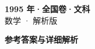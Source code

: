 \documentclass[zihao=-4, a4paper]{ctexart}
\begin{document}
\begin{center}
  {\Large\bfseries 1995 年·全国卷·文科}\\[4pt]
  {\large 数学 · 解析版}
\end{center}
\medskip
{}

\clearpage
{}
\begin{center}{\Large\bfseries 参考答案与详细解析}\end{center}
\medskip

\end{document}
